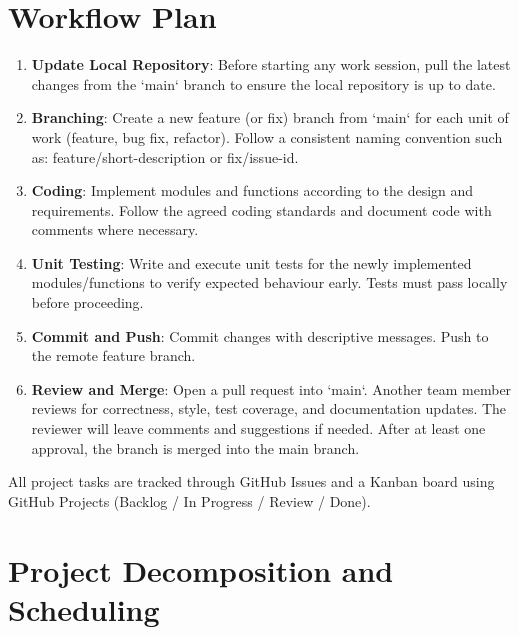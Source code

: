 \documentclass{article}
\begin{document}
\section{Workflow Plan}

\begin{enumerate}
  \item \textbf{Update Local Repository}: Before starting any work session, pull the latest changes from the `main` branch to ensure the local repository is up to date.
  \item \textbf{Branching}: Create a new feature (or fix) branch from `main` for each unit of work (feature, bug fix, refactor). Follow a consistent naming convention such as: feature/short-description or fix/issue-id.
  \item \textbf{Coding}: Implement modules and functions according to the design and requirements. Follow the agreed coding standards and document code with comments where necessary.
  \item \textbf{Unit Testing}: Write and execute unit tests for the newly implemented modules/functions to verify expected behaviour early. Tests must pass locally before proceeding.
  \item \textbf{Commit and Push}: Commit changes with descriptive messages. Push to the remote feature branch.
  \item \textbf{Review and Merge}: Open a pull request into `main`. Another team member reviews for correctness, style, test coverage, and documentation updates. The reviewer will leave comments and suggestions if needed. After at least one approval, the branch is merged into the main branch.
\end{enumerate}

All project tasks are tracked through GitHub Issues and a Kanban board using GitHub Projects (Backlog / In Progress / Review / Done).

\section{Project Decomposition and Scheduling}
\end{document}
